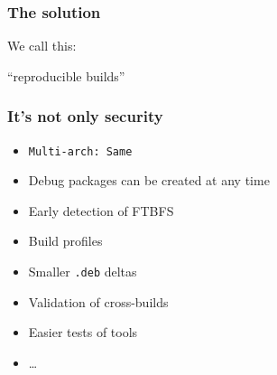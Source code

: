 \documentclass[14pt]{beamer}
\begin{document}
\begin{frame}
 \frametitle{The solution}

 \begin{center}
 We call this:

 \Huge
 “reproducible builds”
 \end{center}
\end{frame}

\begin{frame}
 \frametitle{It's not only security}

 \begin{itemize}
  \item \texttt{Multi-arch: Same}
  \item Debug packages can be created at any time
  \item Early detection of FTBFS
  \item Build profiles
  \item Smaller \texttt{.deb} deltas
  \item Validation of cross-builds
  \item Easier tests of tools
  \item …
 \end{itemize}
\end{frame}

\begin{frame}[plain]
\end{frame}
\end{document}
